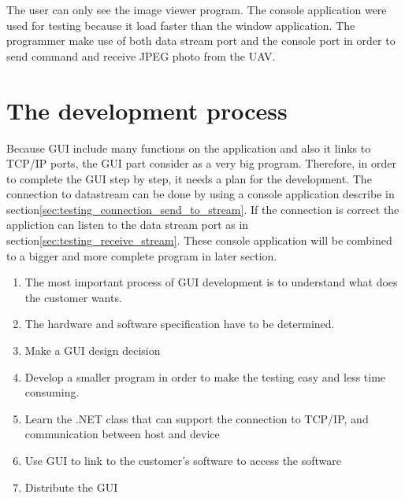 \label{chap:implementation_ground_station }

The user can only see the image viewer program.
The console application were used for testing because it load faster than the window application.
The programmer make use of both data stream port and the console port in order to send command and receive JPEG photo from the UAV.

\section{The development process} 
Because GUI include many functions on the application and also it links to TCP/IP ports, the GUI part consider as a very big program. 
Therefore, in order to complete the GUI step by step, it needs a plan for the development.
The connection to datastream can be done by using a console application describe in section\ref{sec:testing_connection_send_to_stream}.
If the connection is correct the appliction can listen to the data stream port as in section\ref{sec:testing_receive_stream}.
These console application will be combined to a bigger and more complete program in later section.

\flushleft
\begin{enumerate}


\item	The most important process of GUI development is to understand what does the customer wants. 

\item	The hardware and software specification have to be determined.
 
\item	Make a GUI design decision

\item Develop a smaller program in order to make the testing easy and less time consuming. 

\item	Learn the .NET class that can support the connection to TCP/IP, and communication between host and device

\item	Use GUI to link to the customer’s software to access the software

\item	Distribute the GUI
\end{enumerate}

